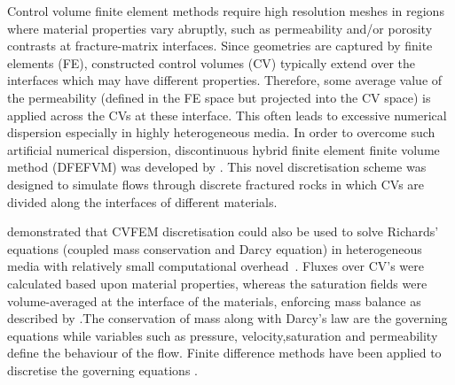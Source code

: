 \documentclass[preprint,authoryear,12pt]{elsarticle}
\begin{document}
Control volume finite element methods require high resolution meshes in regions where material properties vary abruptly, such as permeability and/or porosity contrasts at fracture-matrix interfaces. Since geometries are captured by finite elements (FE), constructed control volumes (CV) typically extend over the interfaces which may have different properties. Therefore, some average value of the permeability (defined in the FE space but projected into the CV space) is applied across the CVs at these interface. This often leads to excessive numerical dispersion especially in highly heterogeneous media. In order to overcome such artificial numerical dispersion, discontinuous hybrid finite element finite volume method (DFEFVM) was developed by \citet{nick_2011b, nick_2011a}. This novel discretisation scheme was designed to simulate flows through discrete fractured rocks in which CVs are divided along the interfaces of different materials.  

\citet{cumming_2011} demonstrated that CVFEM discretisation could also be used to solve Richards' equations (coupled mass conservation and Darcy equation) in heterogeneous media with relatively small computational overhead~\citep[compared with traditional coupled velocity-pressure based formulations, see also][]{cumming_phd2012}. Fluxes over CV's were calculated based upon material properties, whereas the saturation fields were volume-averaged at the interface of the materials, enforcing mass balance as described by \citet{kirkland_1992}.The conservation of mass along with Darcy's law are the governing equations while variables such as pressure, velocity,saturation and permeability define the behaviour of the flow. Finite difference methods have been applied to discretise the governing equations \citep{Luo2016,Moortgat2016,Hoteit2008} .
\end{document}
